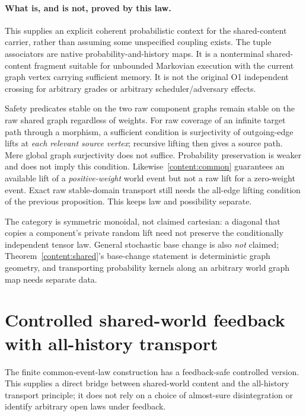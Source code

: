 \documentclass[11pt]{article}
\begin{document}
\paragraph{What is, and is not, proved by this law.} This supplies an explicit coherent probabilistic context for the shared-content carrier, rather than assuming some unspecified coupling exists. The tuple associators are native probability-and-history maps. It is a nonterminal shared-content fragment suitable for unbounded Markovian execution with the current graph vertex carrying sufficient memory. It is not the original O1 independent crossing for arbitrary grades or arbitrary scheduler/adversary effects.

Safety predicates stable on the two raw component graphs remain stable on the raw shared graph regardless of weights. For raw coverage of an infinite target path through a morphism, a sufficient condition is surjectivity of outgoing-edge lifts at \emph{each relevant source vertex}; recursive lifting then gives a source path. Mere global graph surjectivity does not suffice. Probability preservation is weaker and does not imply this condition. Likewise~\eqref{content:common} guarantees an available lift of a \emph{positive-weight} world event but not a raw lift for a zero-weight event. Exact raw stable-domain transport still needs the all-edge lifting condition of the previous proposition. This keeps law and possibility separate.

The category is symmetric monoidal, not claimed cartesian: a diagonal that copies a component's private random lift need not preserve the conditionally independent tensor law. General stochastic base change is also \emph{not} claimed; Theorem~\ref{content:shared}'s base-change statement is deterministic graph geometry, and transporting probability kernels along an arbitrary world graph map needs separate data.

\section{Controlled shared-world feedback with all-history transport}\label{content:controlledworld}
The finite common-event-law construction has a feedback-safe controlled version. This supplies a direct bridge between shared-world content and the all-history transport principle; it does not rely on a choice of almost-sure disintegration or identify arbitrary open laws under feedback.
\end{document}
